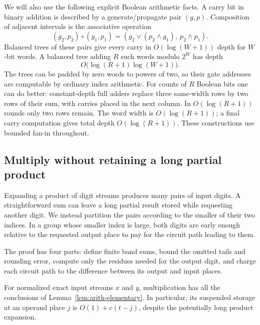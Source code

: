 We will also use the following explicit Boolean arithmetic facts.
A carry bit in binary addition is described by a generate/propagate
pair $(g,p)$.  Composition of adjacent intervals is the associative
operation
\[
 (g_2,p_2)\circ(g_1,p_1)
   =(g_2\lor(p_2\land g_1),\ p_2\land p_1).
\]
Balanced trees of these pairs give every carry in $O(\log(W+1))$
depth for $W$-bit words.  A balanced tree adding $R$ such words modulo
$2^W$ has depth
\begin{equation}
 O\bigl(\log(R+1)\log(W+1)\bigr).
 \label{eq:arith-adder-depth}
\end{equation}
The trees can be padded by zero words to powers of two, so their
gate addresses are computable by ordinary index arithmetic.
For counts of $R$ Boolean bits one can do better: constant-depth
full adders replace three same-width rows by two rows of their sum,
with carries placed in the next column.  In $O(\log(R+1))$ rounds
only two rows remain.  The word width is $O(\log(R+1))$; a final
carry computation gives total depth $O(\log(R+1))$.  These
constructions use bounded fan-in throughout.

\subsection{Multiply without retaining a long partial product}

Expanding a product of digit streams produces many pairs of input digits. A straightforward sum can leave a long partial result stored while requesting another digit. We instead partition the pairs according to the smaller of their two indices. In a group whose smaller index is large, both digits are early enough relative to the requested output place to pay for the circuit path leading to them.

The proof has four parts: define finite band sums, bound the omitted tails and rounding error, compute only the residues needed for the output digit, and charge each circuit path to the difference between its output and input places.

\begin{lemma}[Multiplication]
\label{lem:arith-multiplication}
For normalized exact input streams $x$ and $y$, multiplication has all
the conclusions of Lemma~\ref{lem:arith-elementary}.  In particular,
its suspended storage at an operand place $j$ is
$O(1)+c(t-j)$, despite the potentially long product expansion.
\end{lemma}

